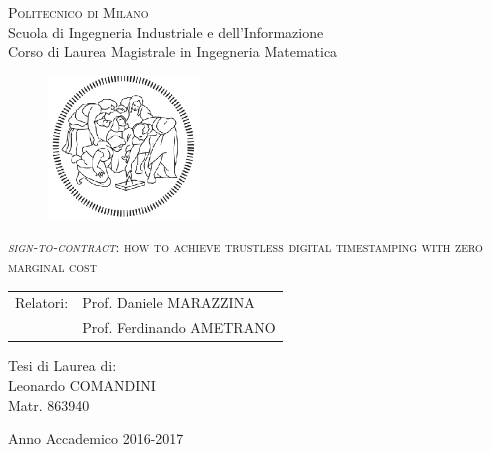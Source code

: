 \begin{titlepage}

	\begin{center}
		\normalsize 
			\textsc{Politecnico di Milano}\\
			Scuola di Ingegneria Industriale e dell'Informazione\\
      		Corso di Laurea Magistrale in Ingegneria Matematica\\
	\end{center}
	\vspace{.6cm}
	
	\begin{figure}[htpb]
		\centering
		\includegraphics[width=4cm]{Cover/polimi}
	\end{figure}
	\vspace{.6cm}
	
	\begin{center}
		\LARGE
			\textsc{\textit{sign-to-contract}: how to achieve trustless digital timestamping with zero marginal cost}
	\end{center}
	\vspace{1.6cm}

	\begin{flushleft}
		\large
		\begin{tabular}{ll}
		Relatori:    & Prof. Daniele MARAZZINA      \\
		             & Prof. Ferdinando AMETRANO
		\end{tabular}
		\vspace{1cm}
	\end{flushleft}
	
	\begin{flushright}
		\large
		Tesi di Laurea di:\\
		Leonardo COMANDINI\\
		Matr. 863940\\		
	\end{flushright}
	
	\vspace*{\fill}
	\begin{center}
		Anno Accademico 2016-2017
	\end{center}
	
\end{titlepage}
